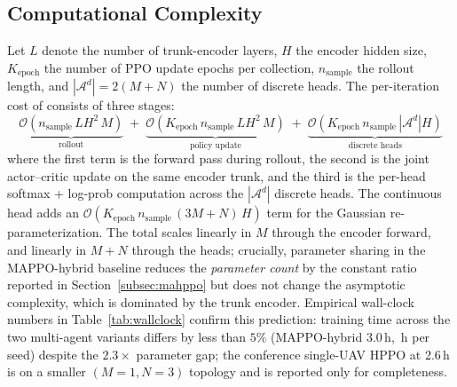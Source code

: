 \subsection{Computational Complexity}\label{subsec:complexity}
Let $L$ denote the number of trunk-encoder layers, $H$ the encoder
hidden size, $K_{\mathrm{epoch}}$ the number of PPO update epochs per
collection, $n_{\mathrm{sample}}$ the rollout length, and
$|\mathcal{A}^{d}|=2(M+N)$ the number of discrete heads. The
per-iteration cost of \method consists of three stages:
\begin{equation*}
\underbrace{\mathcal{O}(n_{\mathrm{sample}}\,L H^{2}\,M)}_{\text{rollout}}
\;+\;
\underbrace{\mathcal{O}(K_{\mathrm{epoch}}\,n_{\mathrm{sample}}\,L H^{2}\,M)}_{\text{policy update}}
\;+\;
\underbrace{\mathcal{O}(K_{\mathrm{epoch}}\,n_{\mathrm{sample}}\,|\mathcal{A}^{d}|H)}_{\text{discrete heads}}
\end{equation*}
where the first term is the forward pass during rollout, the second is
the joint actor--critic update on the same encoder trunk, and the third
is the per-head softmax + log-prob computation across the
$|\mathcal{A}^{d}|$ discrete heads. The continuous head adds an
$\mathcal{O}(K_{\mathrm{epoch}}\,n_{\mathrm{sample}}\,(3M+N)\,H)$ term
for the Gaussian re-parameterization. The total scales linearly in $M$
through the encoder forward, and linearly in $M+N$ through the heads;
crucially, parameter sharing in the MAPPO-hybrid baseline reduces the
\emph{parameter count} by the constant ratio reported in
Section~\ref{subsec:mahppo} but does not change the asymptotic
complexity, which is dominated by the trunk encoder. Empirical
wall-clock numbers in Table~\ref{tab:wallclock} confirm this
prediction: training time across the two multi-agent variants differs
by less than $5\%$ (MAPPO-hybrid 3.0\,h, \,h per seed) despite
the $2.3\!\times$ parameter gap; the conference single-UAV HPPO at
2.6\,h is on a smaller $(M{=}1,N{=}3)$ topology and is reported only
for completeness.
